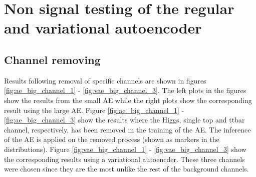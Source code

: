 \section{Non signal testing of the regular and variational autoencoder}\label{sec:nonsig}

\subsection*{Channel removing}

Results following removal of specific channels are shown in figures \ref{fig:ae_big_channel_1} - \ref{fig:vae_big_channel_3}. The left 
plots in the figures show the results from the small AE while the right plots show the corresponding result using the large AE.
Figure \ref{fig:ae_big_channel_1} - \ref{fig:ae_big_channel_3} show the results where the Higgs, single 
top and ttbar channel, respectively,  has been removed in the training of the AE. The inference of the AE is applied on the removed 
process (shown as markers in the distributions). Figure \ref{fig:vae_big_channel_1} - \ref{fig:vae_big_channel_3} show the corresponding 
results using a variational autoencder. These three channels were chosen since they are the most unlike the rest of the background channels. 


